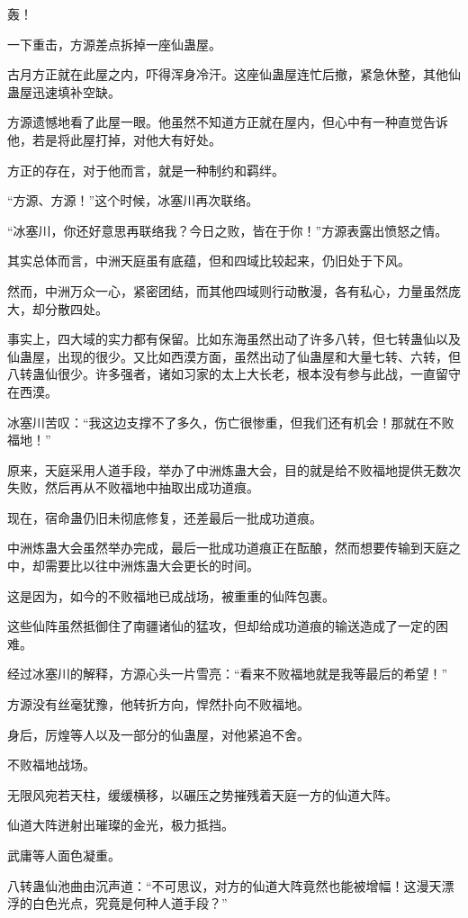 \begin{this_body}
轰！

一下重击，方源差点拆掉一座仙蛊屋。

古月方正就在此屋之内，吓得浑身冷汗。这座仙蛊屋连忙后撤，紧急休整，其他仙蛊屋迅速填补空缺。

方源遗憾地看了此屋一眼。他虽然不知道方正就在屋内，但心中有一种直觉告诉他，若是将此屋打掉，对他大有好处。

方正的存在，对于他而言，就是一种制约和羁绊。

“方源、方源！”这个时候，冰塞川再次联络。

“冰塞川，你还好意思再联络我？今日之败，皆在于你！”方源表露出愤怒之情。

其实总体而言，中洲天庭虽有底蕴，但和四域比较起来，仍旧处于下风。

然而，中洲万众一心，紧密团结，而其他四域则行动散漫，各有私心，力量虽然庞大，却分散四处。

事实上，四大域的实力都有保留。比如东海虽然出动了许多八转，但七转蛊仙以及仙蛊屋，出现的很少。又比如西漠方面，虽然出动了仙蛊屋和大量七转、六转，但八转蛊仙很少。许多强者，诸如习家的太上大长老，根本没有参与此战，一直留守在西漠。

冰塞川苦叹：“我这边支撑不了多久，伤亡很惨重，但我们还有机会！那就在不败福地！”

原来，天庭采用人道手段，举办了中洲炼蛊大会，目的就是给不败福地提供无数次失败，然后再从不败福地中抽取出成功道痕。

现在，宿命蛊仍旧未彻底修复，还差最后一批成功道痕。

中洲炼蛊大会虽然举办完成，最后一批成功道痕正在酝酿，然而想要传输到天庭之中，却需要比以往中洲炼蛊大会更长的时间。

这是因为，如今的不败福地已成战场，被重重的仙阵包裹。

这些仙阵虽然抵御住了南疆诸仙的猛攻，但却给成功道痕的输送造成了一定的困难。

经过冰塞川的解释，方源心头一片雪亮：“看来不败福地就是我等最后的希望！”

方源没有丝毫犹豫，他转折方向，悍然扑向不败福地。

身后，厉煌等人以及一部分的仙蛊屋，对他紧追不舍。

不败福地战场。

无限风宛若天柱，缓缓横移，以碾压之势摧残着天庭一方的仙道大阵。

仙道大阵迸射出璀璨的金光，极力抵挡。

武庸等人面色凝重。

八转蛊仙池曲由沉声道：“不可思议，对方的仙道大阵竟然也能被增幅！这漫天漂浮的白色光点，究竟是何种人道手段？”


\end{this_body}
